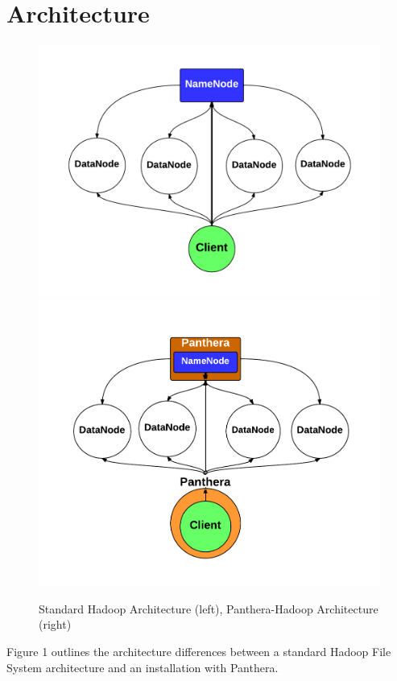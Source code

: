 \documentclass[12pt]{article}
\begin{document}
\section{Architecture}
\begin{figure}[!h]
  \caption{Standard Hadoop Architecture (left), Panthera-Hadoop Architecture (right)}
  \centering
	\includegraphics[scale=0.4]{assets/hadoop_architecture.pdf}
	\includegraphics[scale=0.4]{assets/panthera_architecture.pdf}
\end{figure}

Figure 1 outlines the architecture differences between a standard Hadoop File System architecture and an installation with Panthera. 
\end{document}
